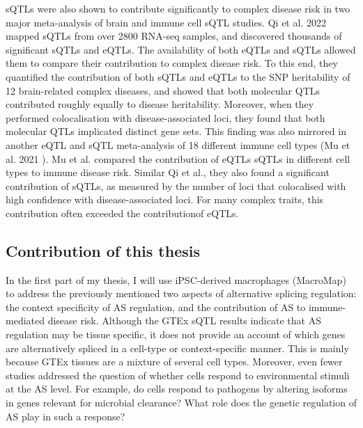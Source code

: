 sQTLs were also shown to contribute significantly to complex disease risk in two major meta-analysis of brain and immune cell sQTL studies. Qi et al. 2022 \cite{Qi2022-iz} mapped sQTLs from over 2800 RNA-seq samples, and discovered thousands of significant sQTLs and eQTLs. The availability of both eQTLs and sQTLs allowed them to compare their contribution to complex disease risk. To this end, they quantified the contribution of both sQTLs and eQTLs to the SNP heritability of 12 brain-related complex diseases, and showed that both molecular QTLs contributed roughly equally to disease heritability. Moreover, when they performed colocalisation with disease-associated loci, they found that both molecular QTLs implicated distinct gene sets. This finding was also mirrored in another eQTL and sQTL meta-analysis of 18 different immune cell types (Mu et al. 2021 \cite{Mu2021-ar}). Mu et al. compared the contribution of eQTLs sQTLs in different cell types to immune disease risk. Similar Qi et al., they also found a significant contribution of sQTLs, as measured by the number of loci that colocalised with high confidence with disease-associated loci. For many complex traits, this contribution often exceeded the contributionof eQTLs.\\

\subsection{Contribution of this thesis}
In the first part of my thesis, I will use iPSC-derived macrophages (MacroMap) to address the previously mentioned two aspects of alternative splicing regulation: the context specificity of AS regulation, and the contribution of AS to immune-mediated disease risk. Although the GTEx sQTL results indicate that AS regulation may be tissue specific, it does not provide an account of which genes are alternatively spliced in a cell-type or context-specific manner. This is mainly because GTEx tissues are a mixture of several cell types. Moreover, even fewer studies addressed the question of whether cells respond to environmental stimuli at the AS level. For example, do cells respond to pathogens by altering isoforms in genes relevant for microbial clearance? What role does the genetic regulation of AS play in such a response?\\

